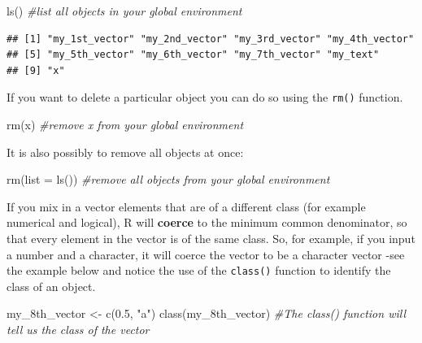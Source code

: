 \documentclass[
]{book}
\newenvironment{Shaded}{\begin{snugshade}}{\end{snugshade}}
\newcommand{\AttributeTok}[1]{\textcolor[rgb]{0.77,0.63,0.00}{#1}}
\newcommand{\CommentTok}[1]{\textcolor[rgb]{0.56,0.35,0.01}{\textit{#1}}}
\newcommand{\FloatTok}[1]{\textcolor[rgb]{0.00,0.00,0.81}{#1}}
\newcommand{\FunctionTok}[1]{\textcolor[rgb]{0.00,0.00,0.00}{#1}}
\newcommand{\NormalTok}[1]{#1}
\newcommand{\OtherTok}[1]{\textcolor[rgb]{0.56,0.35,0.01}{#1}}
\newcommand{\StringTok}[1]{\textcolor[rgb]{0.31,0.60,0.02}{#1}}
\begin{document}
\begin{Shaded}
\begin{Highlighting}[]
\FunctionTok{ls}\NormalTok{() }\CommentTok{\#list all objects in your global environment}
\end{Highlighting}
\end{Shaded}

\begin{verbatim}
## [1] "my_1st_vector" "my_2nd_vector" "my_3rd_vector" "my_4th_vector"
## [5] "my_5th_vector" "my_6th_vector" "my_7th_vector" "my_text"      
## [9] "x"
\end{verbatim}

If you want to delete a particular object you can do so using the \texttt{rm()} function.

\begin{Shaded}
\begin{Highlighting}[]
\FunctionTok{rm}\NormalTok{(x) }\CommentTok{\#remove x from your global environment}
\end{Highlighting}
\end{Shaded}

It is also possibly to remove all objects at once:

\begin{Shaded}
\begin{Highlighting}[]
\FunctionTok{rm}\NormalTok{(}\AttributeTok{list =} \FunctionTok{ls}\NormalTok{()) }\CommentTok{\#remove all objects from your global environment}
\end{Highlighting}
\end{Shaded}

If you mix in a vector elements that are of a different class (for example numerical and logical), R will \textbf{coerce} to the minimum common denominator, so that every element in the vector is of the same class. So, for example, if you input a number and a character, it will coerce the vector to be a character vector -see the example below and notice the use of the \texttt{class()} function to identify the class of an object.

\begin{Shaded}
\begin{Highlighting}[]
\NormalTok{my\_8th\_vector }\OtherTok{\textless{}{-}} \FunctionTok{c}\NormalTok{(}\FloatTok{0.5}\NormalTok{, }\StringTok{"a"}\NormalTok{)}
\FunctionTok{class}\NormalTok{(my\_8th\_vector) }\CommentTok{\#The class() function will tell us the class of the vector}
\end{Highlighting}
\end{Shaded}
\end{document}
